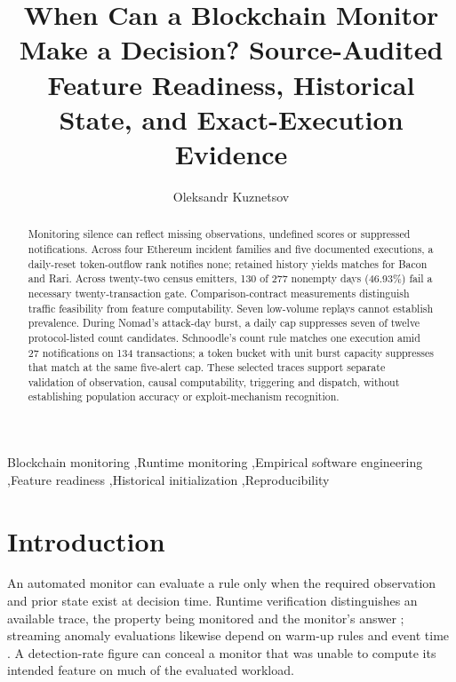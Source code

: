 \documentclass[preprint,12pt,authoryear]{elsarticle}
\begin{document}
\begin{frontmatter}
\title{When Can a Blockchain Monitor Make a Decision? Source-Audited Feature Readiness, Historical State, and Exact-Execution Evidence}
\author[aff1,aff2,aff3]{Oleksandr Kuznetsov}
\address[aff1]{Department of Theoretical and Applied Sciences, eCampus University, Italy}
\address[aff2]{Department of Intelligent Software Systems and Technologies, School of Computer Science and Artificial Intelligence, V.~N. Karazin Kharkiv National University, Ukraine}
\address[aff3]{SMARTEST Research Center, eCampus University, Via Isimbardi 10, Novedrate (CO), 22060, Italy}
\begin{abstract}
Monitoring silence can reflect missing observations, undefined scores or suppressed notifications. Across four Ethereum incident families and five documented executions, a daily-reset token-outflow rank notifies none; retained history yields matches for Bacon and Rari. Across twenty-two census emitters, 130 of 277 nonempty days (46.93\%) fail a necessary twenty-transaction gate. Comparison-contract measurements distinguish traffic feasibility from feature computability. Seven low-volume replays cannot establish prevalence. During Nomad's attack-day burst, a daily cap suppresses seven of twelve protocol-listed count candidates. Schnoodle's count rule matches one execution amid 27 notifications on 134 transactions; a token bucket with unit burst capacity suppresses that match at the same five-alert cap. These selected traces support separate validation of observation, causal computability, triggering and dispatch, without establishing population accuracy or exploit-mechanism recognition.
\end{abstract}
\begin{keyword}
Blockchain monitoring \sep Runtime monitoring \sep Empirical software engineering \sep Feature readiness \sep Historical initialization \sep Reproducibility
\end{keyword}
\end{frontmatter}

\section{Introduction}\label{sec:intro}
An automated monitor can evaluate a rule only when the required observation and prior state exist at decision time. Runtime verification distinguishes an available trace, the property being monitored and the monitor's answer \citep{Leucker2009RV,Bauer2011RV}; streaming anomaly evaluations likewise depend on warm-up rules and event time \citep{Lavin2015NAB}. A detection-rate figure can conceal a monitor that was unable to compute its intended feature on much of the evaluated workload.
\end{document}
